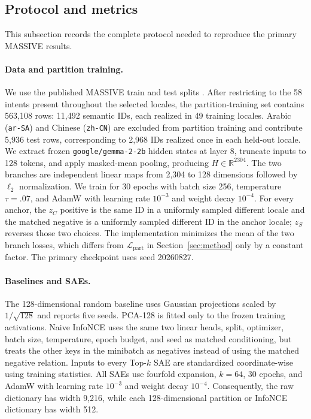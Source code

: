 \documentclass[11pt]{article}
\begin{document}
\subsection{Protocol and metrics}
\label{app:massive-protocol}
This subsection records the complete protocol needed to reproduce the primary MASSIVE results.
\paragraph{Data and partition training.}
We use the published MASSIVE train and test splits \citep{fitzgerald2023massive}. After restricting to the 58 intents present throughout the selected locales, the partition-training set contains 563,108 rows: 11,492 semantic IDs, each realized in 49 training locales. Arabic (\texttt{ar-SA}) and Chinese (\texttt{zh-CN}) are excluded from partition training and contribute 5,936 test rows, corresponding to 2,968 IDs realized once in each held-out locale. We extract frozen \texttt{google/gemma-2-2b} hidden states at layer 8, truncate inputs to 128 tokens, and apply masked-mean pooling, producing $H\in\mathbb{R}^{2304}$. The two branches are independent linear maps from 2,304 to 128 dimensions followed by $\ell_2$ normalization. We train for 30 epochs with batch size 256, temperature $\tau=.07$, and AdamW with learning rate $10^{-3}$ and weight decay $10^{-4}$. For every anchor, the $z_C$ positive is the same ID in a uniformly sampled different locale and the matched negative is a uniformly sampled different ID in the anchor locale; $z_S$ reverses those two choices. The implementation minimizes the mean of the two branch losses, which differs from $\mathcal{L}_{\mathrm{part}}$ in Section~\ref{sec:method} only by a constant factor. The primary checkpoint uses seed 20260827.

\paragraph{Baselines and SAEs.}
The 128-dimensional random baseline uses Gaussian projections scaled by $1/\sqrt{128}$ and reports five seeds. PCA-128 is fitted only to the frozen training activations. Naive InfoNCE uses the same two linear heads, split, optimizer, batch size, temperature, epoch budget, and seed as matched conditioning, but treats the other keys in the minibatch as negatives instead of using the matched negative relation. Inputs to every Top-$k$ SAE are standardized coordinate-wise using training statistics. All SAEs use fourfold expansion, $k=64$, 30 epochs, and AdamW with learning rate $10^{-3}$ and weight decay $10^{-4}$. Consequently, the raw dictionary has width 9,216, while each 128-dimensional partition or InfoNCE dictionary has width 512.
\end{document}

